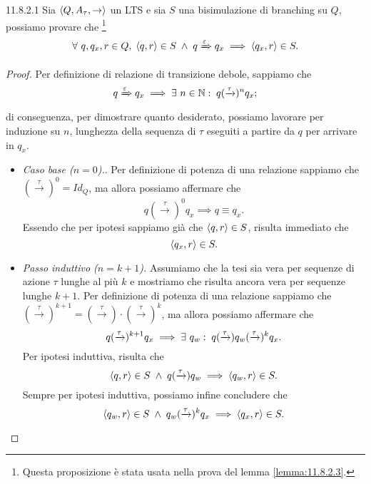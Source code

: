 \begin{customprop}{11.8.2.1}
\label{prop:11.8.2.3.1}
Sia $\langle Q, A_{\tau}, \rightarrow \rangle$ un LTS e sia $S$ una bisimulazione di branching su $Q$, possiamo provare che \footnote{Questa proposizione è stata usata nella prova del lemma \ref{lemma:11.8.2.3}.} \[
	\forall\ q,q_x,r \in Q ,\;
	\langle q, r \rangle \in S \; \land \; q \xRightarrow{\varepsilon} q_x 
	\implies \langle q_x, r \rangle \in S.
\]
\end{customprop}
\begin{proof}
Per definizione di relazione di transizione debole, sappiamo che \[
	q \xRightarrow{\varepsilon} q_x
	\implies \exists\ n \in \mathbb{N} :\; q (\xrightarrow{\tau})^n q_x;
\]
di conseguenza, per dimostrare quanto desiderato, possiamo lavorare per induzione su $n$, lunghezza della sequenza di $\tau$ eseguiti a partire da $q$ per arrivare in $q_x$.
\begin{itemize}
\item \textit{Caso base ($n=0$).}. Per definizione di potenza di una relazione sappiamo che $(\xrightarrow{\tau})^0 = Id_Q$, ma allora possiamo affermare che \[
	q (\xrightarrow{\tau})^0 q_x \implies q \equiv q_x.
\]
Essendo che per ipotesi sappiamo già che $\langle q, r \rangle \in S$, risulta immediato che \[
	\langle q_x, r \rangle \in S.
\]
\item \textit{Passo induttivo ($n=k+1$).} Assumiamo che la tesi sia vera per sequenze di azione $\tau$ lunghe al più $k$ e mostriamo che risulta ancora vera per sequenze lunghe $k+1$.
Per definizione di potenza di una relazione sappiamo che 
$(\xrightarrow{\tau})^{k+1} = (\xrightarrow{\tau}) \cdot (\xrightarrow{\tau})^k$,
ma allora possiamo affermare che  \[
	q (\xrightarrow{\tau})^{k+1} q_x \implies \exists\ q_w :\;
	q (\xrightarrow{\tau}) q_w (\xrightarrow{\tau})^k q_x.
\]
Per ipotesi induttiva, risulta che \[
	\langle q,r \rangle \in S \; \land \; q (\xrightarrow{\tau}) q_w
	\implies \langle q_w, r \rangle \in S.
\]
Sempre per ipotesi induttiva, possiamo infine concludere che \[
	\langle q_w,r \rangle \in S \; \land \; q_w (\xrightarrow{\tau})^k q_x
	\implies \langle q_x, r \rangle \in S.
\]
\end{itemize}
\end{proof}
